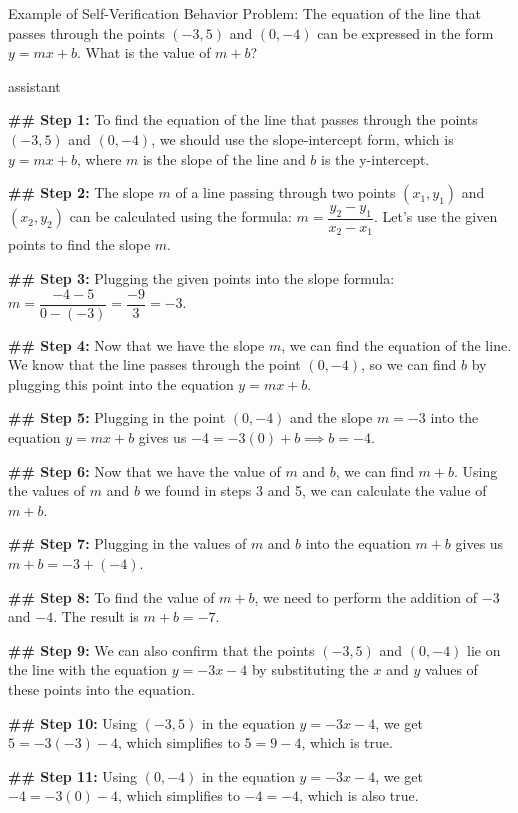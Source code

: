 \begin{promptbox}{Example of Self-Verification Behavior}
Problem: The equation of the line that passes through the points $(-3,5)$ and $(0,-4)$ can be expressed in the form $y=mx+b$. What is the value of $m+b$?

assistant 

\textbf{\#\# Step 1:}
To find the equation of the line that passes through the points $(-3,5)$ and $(0,-4)$, we should use the slope-intercept form, which is $y=mx+b$, where $m$ is the slope of the line and $b$ is the y-intercept.
 
\textbf{\#\# Step 2:}
The slope $m$ of a line passing through two points $(x_1,y_1)$ and $(x_2,y_2)$ can be calculated using the formula: $m=\dfrac{y_2-y_1}{x_2-x_1}$. Let's use the given points to find the slope $m$.
 
\textbf{\#\# Step 3:}
Plugging the given points into the slope formula: $m=\dfrac{-4-5}{0-(-3)}=\dfrac{-9}{3}=-3$.
 
\textbf{\#\# Step 4:}
Now that we have the slope $m$, we can find the equation of the line. We know that the line passes through the point $(0,-4)$, so we can find $b$ by plugging this point into the equation $y=mx+b$.
 
\textbf{\#\# Step 5:}
Plugging in the point $(0,-4)$ and the slope $m=-3$ into the equation $y=mx+b$ gives us $-4=-3(0)+b \implies b=-4$.
 
\textbf{\#\# Step 6:}
Now that we have the value of $m$ and $b$, we can find $m+b$. Using the values of $m$ and $b$ we found in steps 3 and 5, we can calculate the value of $m+b$.
 
\textbf{\#\# Step 7:}
Plugging in the values of $m$ and $b$ into the equation $m+b$ gives us $m+b = -3 + (-4)$.
 
\textbf{\#\# Step 8:}
To find the value of $m+b$, we need to perform the addition of $-3$ and $-4$. The result is $m+b = -7$.
 

{\color{red}
\textbf{\#\# Step 9:}
We can also confirm that the points $(-3,5)$ and $(0,-4)$ lie on the line with the equation $y=-3x-4$ by substituting the $x$ and $y$ values of these points into the equation.
}
 
\textbf{\#\# Step 10:}
Using $(-3,5)$ in the equation $y=-3x-4$, we get $5=-3(-3)-4$, which simplifies to $5=9-4$, which is true.
 
\textbf{\#\# Step 11:}
Using $(0,-4)$ in the equation $y=-3x-4$, we get $-4=-3(0)-4$, which simplifies to $-4=-4$, which is also true.
 

\end{promptbox}
